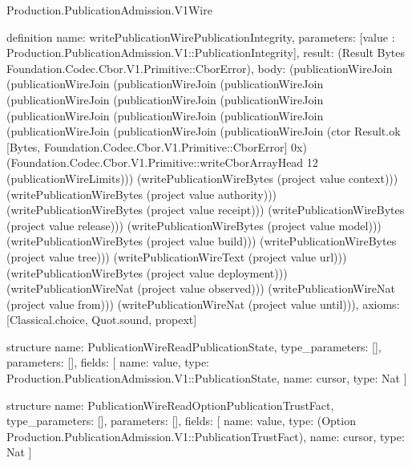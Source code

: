 \begin{lexlean}{Production.PublicationAdmission.V1Wire}
\begin{semanticmodule}
definition{
  name: writePublicationWirePublicationIntegrity,
  parameters: [value : Production.PublicationAdmission.V1::PublicationIntegrity],
  result: (Result Bytes Foundation.Codec.Cbor.V1.Primitive::CborError),
  body: (publicationWireJoin (publicationWireJoin (publicationWireJoin (publicationWireJoin (publicationWireJoin (publicationWireJoin (publicationWireJoin (publicationWireJoin (publicationWireJoin (publicationWireJoin (publicationWireJoin (publicationWireJoin (publicationWireJoin (ctor Result.ok [Bytes, Foundation.Codec.Cbor.V1.Primitive::CborError] 0x) (Foundation.Codec.Cbor.V1.Primitive::writeCborArrayHead 12 (publicationWireLimits))) (writePublicationWireBytes (project value context))) (writePublicationWireBytes (project value authority))) (writePublicationWireBytes (project value receipt))) (writePublicationWireBytes (project value release))) (writePublicationWireBytes (project value model))) (writePublicationWireBytes (project value build))) (writePublicationWireBytes (project value tree))) (writePublicationWireText (project value url))) (writePublicationWireBytes (project value deployment))) (writePublicationWireNat (project value observed))) (writePublicationWireNat (project value from))) (writePublicationWireNat (project value until))),
  axioms: [Classical.choice, Quot.sound, propext]
}

structure{
  name: PublicationWireReadPublicationState,
  type_parameters: [],
  parameters: [],
  fields: [
    {name: value, type: Production.PublicationAdmission.V1::PublicationState},
    {name: cursor, type: Nat}
  ]
}

structure{
  name: PublicationWireReadOptionPublicationTrustFact,
  type_parameters: [],
  parameters: [],
  fields: [
    {name: value, type: (Option Production.PublicationAdmission.V1::PublicationTrustFact)},
    {name: cursor, type: Nat}
  ]
}


\end{semanticmodule}
\end{lexlean}

